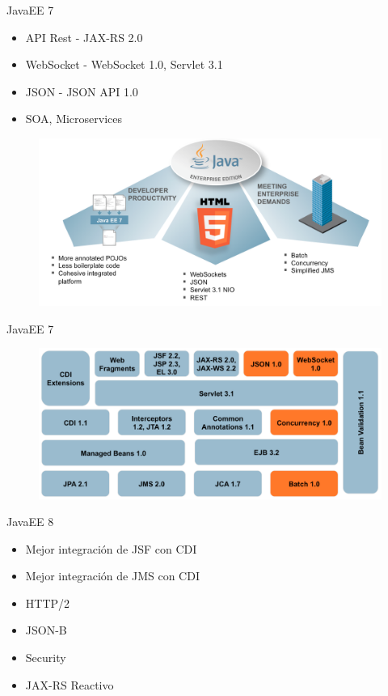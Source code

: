 \documentclass{beamer}
\begin{document}
\begin{frame}{JavaEE 7}
\begin{itemize}
	\item API Rest - JAX-RS 2.0
	\item WebSocket - WebSocket 1.0, Servlet 3.1
	\item JSON - JSON API 1.0
	\item SOA, Microservices
\end{itemize}
\begin{figure}
	\centering
	\includegraphics[width=0.7\linewidth]{Images/javaee7-theme}
\end{figure}

\end{frame}

\begin{frame}{JavaEE 7}
\begin{figure}
\centering
\includegraphics[width=0.9\linewidth]{Images/javaee7-pancake.png}
\end{figure}

\end{frame}


\begin{frame}{JavaEE 8}
	\begin{itemize}
		\item Mejor integración de JSF con CDI
		\item Mejor integración de JMS con CDI
		\item HTTP/2
		\item JSON-B
		\item Security
		\item JAX-RS Reactivo
	\end{itemize}
\end{frame}
\end{document}

